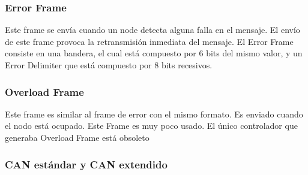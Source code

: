 \subsubsection{Error Frame}
Este frame se envía cuando un node detecta alguna falla en el mensaje. El envío de este frame provoca la retransmisión inmediata del mensaje. El Error Frame consiste en una bandera, el cual está compuesto por 6 bits del mismo valor, y un Error Delimiter que está compuesto por 8 bits recesivos.

\subsubsection{Overload Frame}
Este frame es similar al frame de error con el mismo formato. Es enviado cuando el nodo está ocupado. Este Frame es muy poco usado. El único controlador que generaba Overload Frame está obsoleto \citep{kvaserWEB}


\subsubsection{CAN estándar y CAN extendido}

